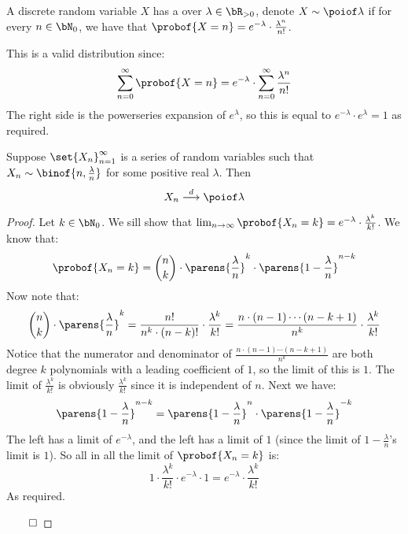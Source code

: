 \begin{defn*}

	A discrete random variable $X$ has a  over $\lambda\in\bR_{>0}$, denote $X\sim\poiof\lambda$ if
	for every $n\in\bN_0$, we have that $\probof{X=n}=e^{-\lambda}\cdot\frac{\lambda^n}{n!}$.

\end{defn*}

\begin{note}

	This is a valid distribution since:
	\[ \sum_{n=0}^\infty \probof{X=n} = e^{-\lambda}\cdot\sum_{n=0}^\infty\frac{\lambda^n}{n!} \]
	The right side is the powerseries expansion of $e^\lambda$, so this is equal to $e^{-\lambda}\cdot e^\lambda=1$ as required.

\end{note}

\begin{thrm*}

	Suppose $\set{X_n}_{n=1}^\infty$ is a series of random variables such that $X_n\sim\binof{n,\frac\lambda n}$ for some positive
	real $\lambda$.
	Then
	\[ X_n\dilim\poiof\lambda \]

\end{thrm*}

\begin{proof}

	Let $k\in\bN_0$.
	We sill show that $\lim_{n\to\infty}\probof{X_n=k} = e^{-\lambda}\cdot\frac{\lambda^k}{k!}$.
	We know that:
	\[ \probof{X_n=k} = \binom nk\cdot \parens{\frac\lambda n}^k\cdot\parens{1-\frac\lambda n}^{n-k} \]
	Now note that:
	\[ \binom nk \cdot\parens{\frac\lambda n}^k = \frac{n!}{n^k\cdot(n-k)!} \cdot \frac{\lambda^k}{k!} =
	\frac{n\cdot(n-1)\cdots(n-k+1)}{n^k}\cdot\frac{\lambda^k}{k!} \]
	Notice that the numerator and denominator of $\frac{n\cdot(n-1)\cdots(n-k+1)}{n^k}$ are both degree $k$ polynomials with a leading
	coefficient of $1$, so the limit of this is $1$.
	The limit of $\frac{\lambda^k}{k!}$ is obviously $\frac{\lambda^k}{k!}$ since it is independent of $n$.
	Next we have:
	\[ \parens{1-\frac\lambda n}^{n-k} = \parens{1-\frac\lambda n}^n \cdot \parens{1-\frac\lambda n}^{-k} \]
	The left has a limit of $e^{-\lambda}$, and the left has a limit of $1$ (since the limit of $1-\frac\lambda n$'s limit is $1$).
	So all in all the limit of $\probof{X_n=k}$ is:
	\[ 1\cdot\frac{\lambda^k}{k!}\cdot e^{-\lambda} \cdot 1 = e^{-\lambda}\cdot\frac{\lambda^k}{k!} \]
	As required.

	\hfill$\qed$

\end{proof}

